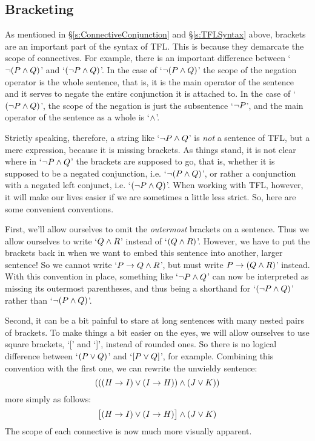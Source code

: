 \subsection{Bracketing}\label{s:TFLBracketing}

As mentioned in \S\ref{s:ConnectiveConjunction} and \S\ref{s:TFLSyntax} above, brackets are an important part of the syntax of TFL.  This is because they demarcate the scope of connectives.  For example, there is an important difference between `$\neg (P \wedge Q)$' and `$(\neg P \wedge Q)$'.  In the case of  `$\neg (P \wedge Q)$' the scope of the negation operator is the whole sentence, that is, it is the main operator of the sentence and it serves to negate the entire conjunction it is attached to. In the case of `$(\neg P \wedge Q)$', the scope of the negation is just the subsentence `$\neg P$', and the main operator of the sentence as a whole is `$\wedge$'.

Strictly speaking, therefore, a string like `$\neg P \wedge Q$' is \emph{not} a sentence of TFL, but a mere expression, because it is missing brackets.  As things stand, it is not clear where in `$\neg P \wedge Q$' the brackets are supposed to go, that is, whether it is supposed to be a negated conjunction, i.e. `$\neg (P \wedge Q)$', or rather a conjunction with a negated left conjunct, i.e.  `$(\neg P \wedge Q)$'.  When working with TFL, however, it will make our lives easier if we are sometimes a little less strict. So, here are some convenient conventions.

First,  we'll allow ourselves to omit the \emph{outermost} brackets on a sentence. Thus we allow ourselves to write `$Q \wedge R$' instead of `$(Q \wedge R)$'. However, we have to put the brackets back in when we want to embed this sentence into another, larger sentence!  So we cannot write `$P \rightarrow Q \wedge R$', but must write $P \rightarrow (Q \wedge R)$' instead.  With this convention in place, something like `$\neg P \wedge Q$' can now be interpreted as missing its outermost parentheses, and thus being a shorthand for `$(\neg P \wedge Q)$' rather than `$\neg (P \wedge Q)$'.

Second, it can be a bit painful to stare at long sentences with many nested pairs of brackets. To make things a bit easier on the eyes, we will allow ourselves to use square brackets, `[' and `]', instead of rounded ones. So there is no logical difference between `$(P\vee Q)$' and `$[P\vee Q]$', for example. Combining this convention with the first one, we can rewrite the unwieldy sentence:
$$(((H \rightarrow I) \vee (I \rightarrow H)) \wedge (J \vee K))$$
more simply as follows:
$$\bigl[(H \rightarrow I) \vee (I \rightarrow H)\bigr] \wedge (J \vee K)$$
The scope of each connective is now much more visually apparent.

